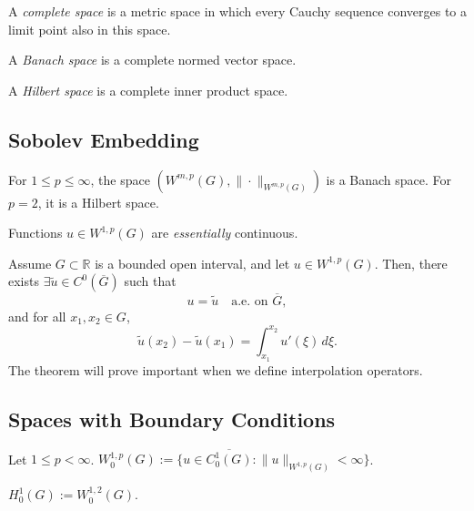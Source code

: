 \begin{definition}
A \textit{complete space} is a metric space in which every Cauchy sequence converges to a limit point also in this space.
\end{definition}

\begin{definition}
A \textit{Banach space} is a complete normed vector space.
\end{definition}

\begin{definition}
A \textit{Hilbert space} is a complete inner product space.
\end{definition}

\subsection{Sobolev Embedding}

\begin{proposition}
For $1 \leq p \leq \infty$, the space $(W^{m,p}(G), \| \cdot \|_{W^{m,p}(G)})$ is a Banach space. For $p = 2$, it is a Hilbert space.
\end{proposition}

Functions $u \in W^{1,p}(G)$ are \textit{essentially} continuous.

\begin{theorem}
Assume $G \subset \mathbb{R}$ is a bounded open interval, and let $u \in W^{1,p}(G)$. Then, there exists $\exists \tilde{u} \in C^0(\overline{G})$ such that
\[
u = \tilde{u} \quad \text{a.e. on } \overline{G},
\]
and for all $x_1, x_2 \in G$,
\[
\tilde{u}(x_2) - \tilde{u}(x_1) = \int_{x_1}^{x_2} u'(\xi) \, d\xi.
\]
The theorem will prove important when we define interpolation operators.
\end{theorem}

\subsection{Spaces with Boundary Conditions}

\begin{definition}
Let $1 \leq p < \infty$. $W^{1,p}_0(G) := \{ u \in \overline{C^1_0(G)} : \|u\|_{W^{1,p}(G)} < \infty \}$.
\end{definition}

\begin{definition}
$H^1_0(G) := W^{1,2}_0(G)$.
\end{definition}

